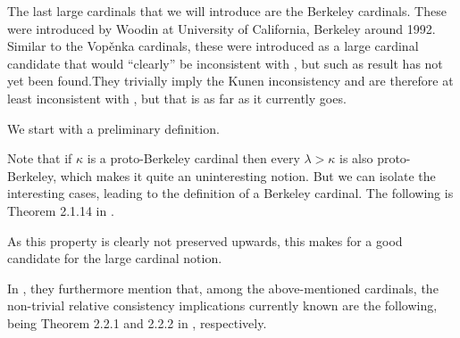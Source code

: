 \documentclass[../../main]{subfiles}
\begin{document}

The last large cardinals that we will introduce are the Berkeley cardinals. These were introduced by Woodin at University of California, Berkeley around 1992. Similar to the Vop\v enka cardinals, these were introduced as a large cardinal candidate that would ``clearly'' be inconsistent with \zf, but such as result has not yet been found.They trivially imply the Kunen inconsistency and are therefore at least inconsistent with \zfc, but that is as far as it currently goes.

\qquad We start with a preliminary definition.


Note that if $\kappa$ is a proto-Berkeley cardinal then every $\lambda>\kappa$ is also proto-Berkeley, which makes it quite an uninteresting notion. But we can isolate the interesting cases, leading to the definition of a Berkeley cardinal. The following is Theorem 2.1.14 in \cite{Cutolo}.


As this property is clearly not preserved upwards, this makes for a good candidate for the large cardinal notion.


In \cite{Cutolo}, they furthermore mention that, among the above-mentioned cardinals, the non-trivial relative consistency implications currently known are the following, being Theorem 2.2.1 and 2.2.2 in \cite{Cutolo}, respectively.

\end{document}
